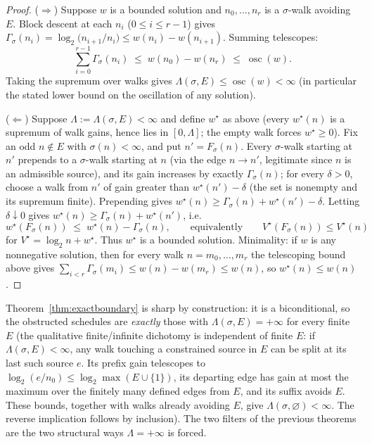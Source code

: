 \documentclass[11pt]{amsart}
\theoremstyle{definition}
\theoremstyle{remark}
\begin{document}
\begin{proof}
($\Rightarrow$) Suppose $w$ is a bounded solution and $n_0,\dots,n_r$ is a $\sigma$-walk avoiding $E$. Block descent at each $n_i$ ($0 \le i \le r-1$) gives $\Gamma_\sigma(n_i) = \log_2\bigl(n_{i+1}/n_i\bigr) \le w(n_i) - w(n_{i+1})$. Summing telescopes:
\[
\textstyle\sum_{i=0}^{r-1}\Gamma_\sigma(n_i) \;\le\; w(n_0) - w(n_r) \;\le\; \operatorname{osc}(w).
\]
Taking the supremum over walks gives $\Lambda(\sigma,E) \le \operatorname{osc}(w) < \infty$ (in particular the stated lower bound on the oscillation of any solution).

($\Leftarrow$) Suppose $\Lambda := \Lambda(\sigma,E) < \infty$ and define $w^\star$ as above (every $w^\star(n)$ is a supremum of walk gains, hence lies in $[0, \Lambda]$; the empty walk forces $w^\star \ge 0$). Fix an odd $n \notin E$ with $\sigma(n) < \infty$, and put $n' = F_\sigma(n)$. Every $\sigma$-walk starting at $n'$ prepends to a $\sigma$-walk starting at $n$ (via the edge $n \to n'$, legitimate since $n$ is an admissible source), and its gain increases by exactly $\Gamma_\sigma(n)$; for every $\delta>0$, choose a walk from $n'$ of gain greater than $w^\star(n')-\delta$ (the set is nonempty and its supremum finite). Prepending gives $w^\star(n)\ge\Gamma_\sigma(n)+w^\star(n')-\delta$. Letting $\delta\downarrow0$ gives $w^\star(n) \ge \Gamma_\sigma(n) + w^\star(n')$, i.e.
\[
w^\star(F_\sigma(n)) \;\le\; w^\star(n) - \Gamma_\sigma(n),
\qquad\text{equivalently}\qquad
V^\star(F_\sigma(n)) \le V^\star(n)
\]
for $V^\star = \log_2 n + w^\star$. Thus $w^\star$ is a bounded solution. Minimality: if $w$ is any nonnegative solution, then for every walk $n = m_0, \dots, m_r$ the telescoping bound above gives $\sum_{i<r}\Gamma_\sigma(m_i) \le w(n) - w(m_r) \le w(n)$, so $w^\star(n) \le w(n)$.
\end{proof}

Theorem~\ref{thm:exactboundary} is sharp by construction: it is a biconditional, so the obstructed schedules are \emph{exactly} those with $\Lambda(\sigma,E) = +\infty$ for every finite $E$ (the qualitative finite/infinite dichotomy is independent of finite $E$: if $\Lambda(\sigma,E)<\infty$, any walk touching a constrained source in $E$ can be split at its last such source $e$. Its prefix gain telescopes to $\log_2(e/n_0)\le\log_2\max(E\cup\{1\})$, its departing edge has gain at most the maximum over the finitely many defined edges from $E$, and its suffix avoids $E$. These bounds, together with walks already avoiding $E$, give $\Lambda(\sigma,\varnothing)<\infty$. The reverse implication follows by inclusion). The two filters of the previous theorems are the two structural ways $\Lambda = +\infty$ is forced.
\end{document}
